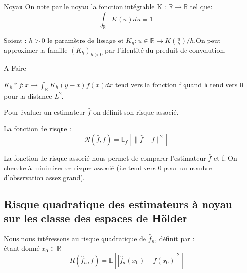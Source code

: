 \documentclass[
]{book}
\theoremstyle{definition}
\theoremstyle{definition}
\theoremstyle{definition}
\theoremstyle{definition}
\theoremstyle{remark}
\begin{document}
\begin{dfn} {Noyau}  \newline
On note par le noyau la fonction intégrable K : $\mathbb{R}\rightarrow\mathbb{R}$ tel que:
$$\int_{\mathbb{R}}K(u)du =1.$$
\end{dfn}

\begin{lem}  
Soient :\newline 
$h>0$ le paramètre de lissage et $K_h : u\in \mathbb{R} \rightarrow K(\frac{u}{h})/h$.On peut approximer la famille $(K_h)_{h>0}$ par l'identité du produit de convolution.
\end{lem}

\begin{demo}
A Faire
\end{demo}

\begin{corol}
$K_h * f : x \rightarrow \int_{\mathbb R} K_h(y-x) f(x) dx$ tend vers la fonction f quand h tend vers 0 pour la distance $L^2$.
\end{corol}

Pour évaluer un estimateur \(\hat{f}\) on définit son risque associé.\newline 

\begin{dfn} 
La fonction de risque : 
$$ 
\mathcal R(\hat f ,f)=\mathbb E_f[\parallel\hat f -f\parallel^2]
$$
\end{dfn}

\begin{rem}
  La fonction de risque associé nous permet de comparer l'estimateur $\hat f$ et  f.\newline
On cherche à minimiser ce risque associé (i.e tend vers 0 pour un nombre d'observation assez grand).\newline
\end{rem}

\hypertarget{risque-quadratique-des-estimateurs-uxe0-noyau-sur-les-classe-des-espaces-de-huxf6lder}{%
\subsection{Risque quadratique des estimateurs à noyau sur les classe des espaces de Hölder}\label{risque-quadratique-des-estimateurs-uxe0-noyau-sur-les-classe-des-espaces-de-huxf6lder}}

Nous nous intéressons au risque quadratique de \(\hat{f}_n\), définit par :\\
étant donné \(x_0 \in \mathbb{R}\)
\[
R(\hat {f}_n, f) = \mathbb{E}[|\hat {f}_n(x_0) - f(x_0)|^2]
\]
\end{document}

